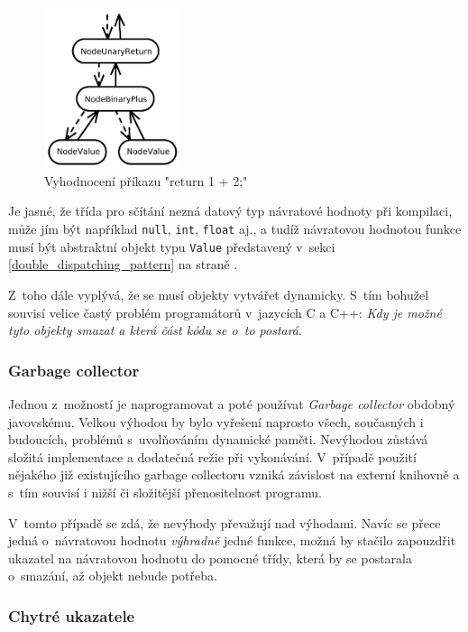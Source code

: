\documentclass[11pt,twoside,a4paper]{book}
\begin{document}
\begin{figure}[ht]
\begin{center}
\includegraphics[width=4cm]{img/execute.pdf}
\caption[Vyhodnocení příkazu]{Vyhodnocení příkazu "return 1 + 2;"}
\label{fig:execute}
\end{center}
\end{figure}

Je jasné, že třída pro sčítání nezná datový typ návratové hodnoty při kompilaci, může jím být například \texttt{null}, \texttt{int}, \texttt{float} aj., a tudíž návratovou hodnotou funkce musí být abstraktní objekt typu \texttt{Value} představený v~sekci \ref{double_dispatching_pattern} na straně \pageref{double_dispatching_pattern}.

Z~toho dále vyplývá, že se musí objekty vytvářet dynamicky. S~tím bohužel souvisí velice častý problém programátorů v~jazycích C a C++: \textit{Kdy je možné tyto objekty smazat a která část kódu se o~to postará}.


\subsubsection{Garbage collector}

Jednou z~možností je naprogramovat a poté používat \textit{Garbage collector} obdobný javovskému. Velkou výhodou by bylo vyřešení naprosto všech, současných i budoucích, problémů s~u\-vol\-ňo\-vá\-ním dynamické paměti. Nevýhodou zůstává složitá implementace a dodatečná režie při vykonávání. V~případě použití nějakého již existujícího garbage collectoru vzniká závislost na externí knihovně a s~tím souvisí i nižší či složitější přenositelnost programu.

V~tomto případě se zdá, že nevýhody převažují nad výhodami. Navíc se přece jedná o~ná\-vra\-to\-vou hodnotu \textit{výhradně} jedné funkce, možná by stačilo zapouzdřit ukazatel na návratovou hodnotu do pomocné třídy, která by se postarala o~smazání, až objekt nebude potřeba.


\subsubsection{Chytré ukazatele}
\end{document}

